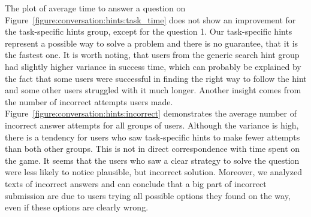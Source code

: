 The plot of average time to answer a question on Figure~\ref{figure:conversation:hints:task_time} does not show an improvement for the task-specific hints group, except for the question 1.
Our task-specific hints represent a possible way to solve a problem and there is no guarantee, that it is the fastest one.
It is worth noting, that users from the generic search hint group had slightly higher variance in success time, which can probably be explained by the fact that some users were successful in finding the right way to follow the hint and some other users struggled with it much longer.
Another insight comes from the number of incorrect attempts users made.
Figure~\ref{figure:conversation:hints:incorrect} demonstrates the average number of incorrect answer attempts for all groups of users.
Although the variance is high, there is a tendency for users who saw task-specific hints to make fewer attempts than both other groups.
This is not in direct correspondence with time spent on the game.
It seems that the users who saw a clear strategy to solve the question were less likely to notice plausible, but incorrect solution.
Moreover, we analyzed texts of incorrect answers and can conclude that a big part of incorrect submission are due to users trying all possible options they found on the way, even if these options are clearly wrong.



